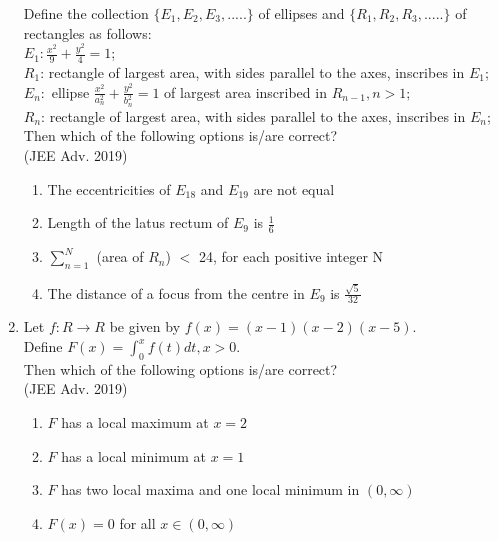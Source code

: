 \documentclass[journal,12pt,twocolumn]{IEEEtran}
\theoremstyle{remark}
\begin{document}
\begin{enumerate}
{            Define the collection $\{E_1, E_2, E_3, .....\}$ of ellipses and $\{R_1, R_2, R_3, .....\}$ of rectangles as follows:\\[6pt]
            $E_1 : \frac{x^2}{9}+ \frac{y^2}{4} = 1$;\\[6pt]
            $R_1$: rectangle of largest area, with sides parallel to the axes, inscribes in $E_1$;\\[6pt]
            $E_n : $ ellipse $\frac{x^2}{a_n^2}+ \frac{y^2}{b_n^2} = 1$ of largest area inscribed in $R_{n-1}, n>1;$\\[6pt]
            $R_n$: rectangle of largest area, with sides parallel to the axes, inscribes in $E_n$;\\ Then which of the following options is/are correct?
            \\ \text{   } \hfill
                {(JEE Adv. 2019)}
            
            \begin{enumerate}
                \item The eccentricities of $E_{18}$ and $E_{19}$ are not equal
                \item Length of the latus rectum of $E_{9}$ is $\frac{1}{6}$
                \item $\sum_{n=1}^N$ (area of $R_n$) $<$ 24, for each positive integer N
                \item The distance of a focus from the centre in $E_9$ is $\frac{\sqrt{5}}{32}$
            \end{enumerate}
        
        }
        \newpage
    \item{
        
            Let $f: R\rightarrow R$ be given by $f(x) = (x-1)(x-2)(x-5)$.\\[6pt] 
            Define $F(x) = \int_0^x f(t)dt, x>0$.\\[3pt]
            Then which of the following options is/are correct?
            \\ \text{   } \hfill
                {(JEE Adv. 2019)}
            
            \begin{enumerate}
                \item $F$ has a local maximum at $x=2$
                \item $F$ has a local minimum at $x=1$
                \item $F$ has two local maxima and one local minimum in $(0,\infty)$
                \item $F(x) = 0$ for all $x \in (0,\infty)$
            \end{enumerate}
        
}
\end{enumerate}
\end{document}
